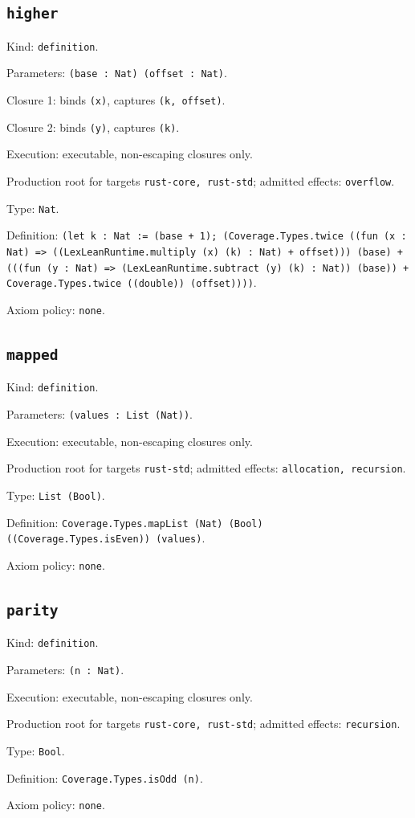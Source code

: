 \documentclass[11pt]{article}
\begin{document}
\subsection*{\texttt{higher}}
\noindent Kind: \texttt{definition}.\par
\noindent Parameters: \texttt{(base : Nat) (offset : Nat)}.\par
\noindent Closure 1: binds \texttt{(x)}, captures \texttt{(k, offset)}.\par
\noindent Closure 2: binds \texttt{(y)}, captures \texttt{(k)}.\par
\noindent Execution: executable, non-escaping closures only.\par
\noindent Production root for targets \texttt{rust-core, rust-std}; admitted effects: \texttt{overflow}.\par
\noindent Type: \texttt{Nat}.\par
\noindent Definition: \texttt{(let k : Nat := (base + 1); (Coverage.Types.twice ((fun (x : Nat) => ((LexLeanRuntime.multiply (x) (k) : Nat) + offset))) (base) + (((fun (y : Nat) => (LexLeanRuntime.subtract (y) (k) : Nat)) (base)) + Coverage.Types.twice ((double)) (offset))))}.\par
\noindent Axiom policy: \texttt{none}.\par
\subsection*{\texttt{mapped}}
\noindent Kind: \texttt{definition}.\par
\noindent Parameters: \texttt{(values : List (Nat))}.\par
\noindent Execution: executable, non-escaping closures only.\par
\noindent Production root for targets \texttt{rust-std}; admitted effects: \texttt{allocation, recursion}.\par
\noindent Type: \texttt{List (Bool)}.\par
\noindent Definition: \texttt{Coverage.Types.mapList (Nat) (Bool) ((Coverage.Types.isEven)) (values)}.\par
\noindent Axiom policy: \texttt{none}.\par
\subsection*{\texttt{parity}}
\noindent Kind: \texttt{definition}.\par
\noindent Parameters: \texttt{(n : Nat)}.\par
\noindent Execution: executable, non-escaping closures only.\par
\noindent Production root for targets \texttt{rust-core, rust-std}; admitted effects: \texttt{recursion}.\par
\noindent Type: \texttt{Bool}.\par
\noindent Definition: \texttt{Coverage.Types.isOdd (n)}.\par
\noindent Axiom policy: \texttt{none}.\par
\end{document}
